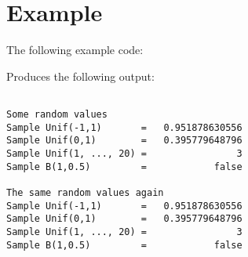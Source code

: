 \section{Example}

The following example code:

Produces the following output:
\begin{verbatim}

Some random values
Sample Unif(-1,1)       =   0.951878630556
Sample Unif(0,1)        =   0.395779648796
Sample Unif(1, ..., 20) =                3
Sample B(1,0.5)         =            false

The same random values again
Sample Unif(-1,1)       =   0.951878630556
Sample Unif(0,1)        =   0.395779648796
Sample Unif(1, ..., 20) =                3
Sample B(1,0.5)         =            false
\end{verbatim}
